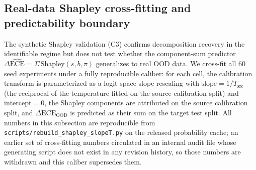 \documentclass[final,5p,times,nonatbib]{elsarticle}
\begin{document}
\subsection{Real-data Shapley cross-fitting and predictability boundary}
\label{sec:real_shapley}
The synthetic Shapley validation (C3) confirms decomposition recovery
in the identifiable regime but does not test whether the component-sum
predictor $\Delta\widehat{\text{ECE}} = \Sigma\,\text{Shapley}(s, b,
\pi)$ generalizes to real OOD data. We cross-fit all 60 seed
experiments under a fully reproducible caliber: for each cell, the
calibration transform is parameterized as a logit-space slope
rescaling with $\text{slope} = 1/T_{\text{src}}$ (the reciprocal of
the temperature fitted on the source calibration split) and
$\text{intercept} = 0$, the Shapley components are attributed on the
source calibration split, and $\Delta\text{ECE}_{\text{OOD}}$ is
predicted as their sum on the target test split. All numbers in this
subsection are reproducible from
\texttt{scripts/rebuild\_shapley\_slopeT.py} on the released
probability cache; an earlier set of cross-fitting numbers circulated
in an internal audit file whose generating script does not exist in
any revision history, so those numbers are withdrawn and this caliber
supersedes them.
\end{document}
